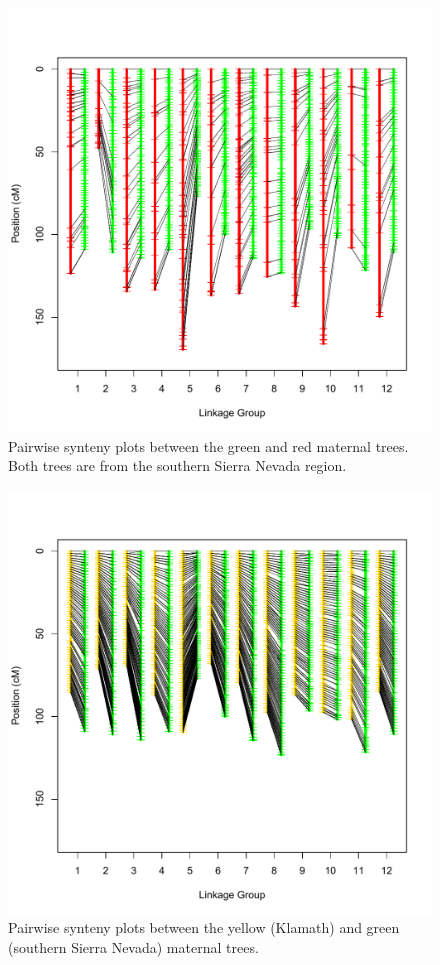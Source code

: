 \documentclass[smallextended]{svjour3}
\begin{document}
\begin{figure}[ht]
  \centering
  \includegraphics[width=\textwidth]{green_red_synteny}
  \caption{Pairwise synteny plots between the green and red maternal trees. Both
    trees are from the southern Sierra Nevada region.}
  \label{f:con}
\end{figure}

\begin{figure}[ht]
  \centering
  \includegraphics[width=\textwidth]{yellow_green_synteny}
  \caption{Pairwise synteny plots between the yellow (Klamath) and green
    (southern Sierra Nevada) maternal trees.}
  \label{f:con}
\end{figure}
\end{document}
